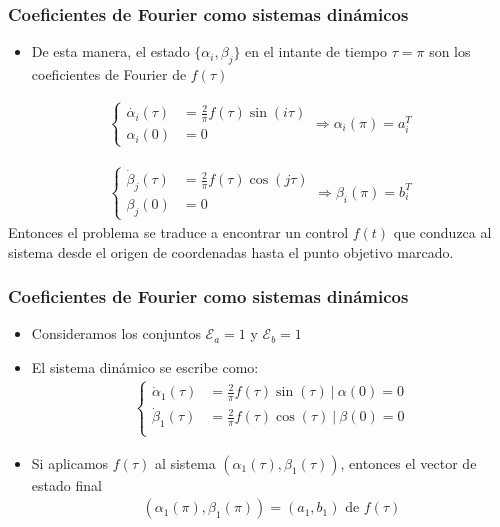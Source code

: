 \begin{frame}
    \frametitle{Coeficientes de Fourier como sistemas dinámicos}
    
    \begin{itemize}
        \item De esta manera, el estado $\{ \alpha_{i},\beta_{j} \}$ en el intante de tiempo $\tau = \pi$ son los coeficientes de Fourier de $f(\tau) $
    \end{itemize}
    \begin{gather}
        \begin{cases} \label{ode}
            \dot{\alpha_i}(\tau) & = \frac{2}{\pi}f(\tau)\sin(i\tau) \\  
            \alpha_i(0) & = 0       
        \end{cases}
        \Rightarrow 
        \alpha_i(\pi) = a_i^T
    \end{gather}
    
    \begin{gather}
        \begin{cases} 
            \dot{\beta}_j(\tau) & = \frac{2}{\pi}f(\tau)\cos(j\tau) \\  
            \beta_j(0) & = 0       
        \end{cases}
        \Rightarrow 
        \beta_i(\pi) = b_i^T
    \end{gather}
    Entonces el problema se traduce a encontrar un control $f(t)$ que conduzca al sistema desde el origen de coordenadas hasta el punto objetivo marcado.
\end{frame}
\begin{frame}
    \frametitle{Coeficientes de Fourier como sistemas dinámicos}
    
    \begin{itemize}
        \item Consideramos los conjuntos $\mathcal{E}_a = {1}$ y $\mathcal{E}_b = {1}$
        \item El sistema dinámico se escribe como:
        \begin{gather}
            \begin{cases} 
                \dot{\alpha}_1(\tau) & = \frac{2}{\pi}f(\tau)\sin(\tau) \ | \ \alpha(0) = 0\\
                \dot{\beta}_1(\tau) & = \frac{2}{\pi}f(\tau)\cos(\tau) \ | \ \beta(0) = 0\\
            \end{cases}  
        \end{gather}

        \item Si aplicamos $f(\tau)$ al sistema $(\alpha_1(\tau),\beta_1(\tau))$, entonces el vector de estado final 
        \begin{gather}
            (\alpha_1(\pi),\beta_1(\pi)) = (a_1,b_1) \text{ de } f(\tau)
        \end{gather}
    \end{itemize}
\end{frame}

